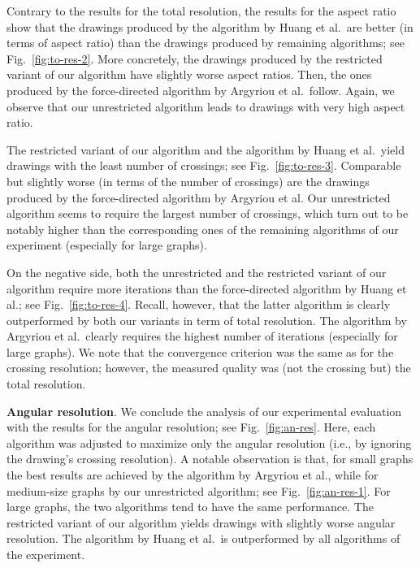 \documentclass[runningheads]{llncs}
\newcommand{\myparagraph}[1]{\smallskip\noindent\textbf{#1}.}
\begin{document}
Contrary to the results for the total resolution, the results for the aspect ratio show that the drawings produced by the algorithm by Huang et al.\ are better (in terms of aspect ratio) than the drawings produced by remaining algorithms; see Fig.~\ref{fig:to-res-2}. More concretely, the drawings produced by the restricted variant of our algorithm have slightly worse aspect ratios. Then, the ones produced by the force-directed algorithm by Argyriou et al.\ follow. Again, we observe that our unrestricted algorithm leads to drawings with very high aspect ratio.

The restricted variant of our algorithm and the algorithm by Huang et al.\ yield drawings with the least number of crossings; see Fig.~\ref{fig:to-res-3}. Comparable but slightly worse (in terms of the number of crossings) are the drawings produced by the force-directed algorithm by Argyriou et al. Our unrestricted algorithm seems to require the largest number of crossings, which turn out to be notably higher than the corresponding ones of the remaining algorithms of our experiment (especially for large graphs). 

On the negative side, both the unrestricted and the restricted variant of our algorithm require more iterations than the  force-directed algorithm by Huang et al.; see Fig.~\ref{fig:to-res-4}. Recall, however, that the latter algorithm is clearly outperformed by both our variants in term of total resolution. The algorithm by Argyriou et al.\ clearly requires the highest number of iterations (especially for large graphs). We note that the convergence criterion was the same as for the crossing resolution; however, the measured quality was (not the crossing but) the total resolution.

\myparagraph{Angular resolution} We conclude the analysis of our experimental evaluation with the  results for the angular resolution; see Fig.~\ref{fig:an-res}. Here, each algorithm was adjusted  to maximize only the angular resolution (i.e., by ignoring the drawing's crossing resolution). A notable observation is that, for small graphs the best results are achieved by the algorithm by Argyriou et al., while for medium-size graphs by our unrestricted algorithm; see Fig.~\ref{fig:an-res-1}. For large graphs, the two algorithms tend to have the same performance. The restricted variant of our algorithm yields drawings with slightly worse angular resolution. The algorithm by Huang et al.\ is outperformed by all algorithms of the experiment. 
\end{document}
